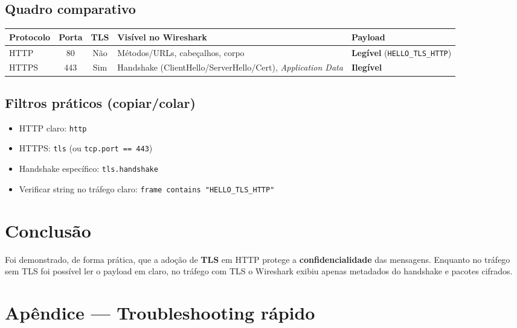 \subsection{Quadro comparativo}

\begin{tabularx}{\linewidth}{lccXX}
\toprule
\textbf{Protocolo} & \textbf{Porta} & \textbf{TLS} & \textbf{Visível no Wireshark} & \textbf{Payload} \\
\midrule
HTTP  & 80  & Não & Métodos/URLs, cabeçalhos, corpo & \textbf{Legível} (\texttt{HELLO\_TLS\_HTTP}) \\
HTTPS & 443 & Sim & Handshake (ClientHello/ServerHello/Cert), \textit{Application Data} & \textbf{Ilegível} \\
\bottomrule
\end{tabularx}

\subsection{Filtros práticos (copiar/colar)}

\begin{itemize}
  \item HTTP claro: \texttt{http}
  \item HTTPS: \texttt{tls} (ou \texttt{tcp.port == 443})
  \item Handshake específico: \texttt{tls.handshake}
  \item Verificar string no tráfego claro: \texttt{frame contains "HELLO\_TLS\_HTTP"}
\end{itemize}

\section{Conclusão}

Foi demonstrado, de forma prática, que a adoção de \textbf{TLS} em HTTP protege a \textbf{confidencialidade} das mensagens. Enquanto no tráfego sem TLS foi possível ler o payload em claro, no tráfego com TLS o Wireshark exibiu apenas metadados do handshake e pacotes cifrados.

\section*{Apêndice --- Troubleshooting rápido}

